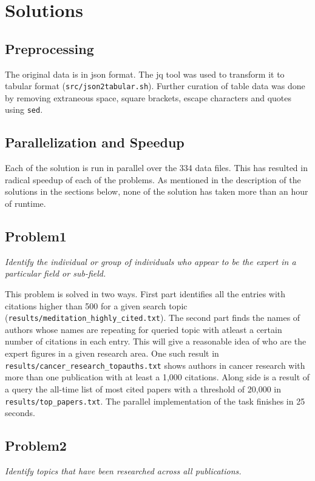 \documentclass{article}
\begin{document}
\section*{Solutions}
\subsection*{Preprocessing}
The original data is in json format. The jq tool was used to transform it to
tabular format (\texttt{src/json2tabular.sh}). Further curation of table data
was done by removing extraneous space, square brackets, escape characters and
quotes using \texttt{sed}.

\subsection*{Parallelization and Speedup}
Each of the solution is run in parallel over the 334 data files. This has
resulted in radical speedup of each of the problems. As mentioned in the
description of the solutions in the sections below, none of the solution has
taken more than an hour of runtime.

\subsection*{Problem1}
\textit{Identify the individual or group of individuals who appear to be the expert in a particular field or sub-field.}

This problem is solved in two ways. First part identifies all the entries with
citations higher than 500 for a given search topic
(\texttt{results/meditation\_highly\_cited.txt}). The second part finds the
names of authors whose names are repeating for queried topic with atleast a
certain number of citations in each entry. This will give a reasonable idea of
who are the expert figures in a given research area. One such result in
\texttt{results/cancer\_research\_topauths.txt} shows authors in cancer
research with more than one publication with at least a 1,000 citations.  Along
side is a result of a query the all-time list of most cited papers with a
threshold of 20,000 in \texttt{results/top\_papers.txt}. The parallel
implementation of the task finishes in 25 seconds.

\subsection*{Problem2}
\textit{Identify topics that have been researched across all publications.}
\end{document}

